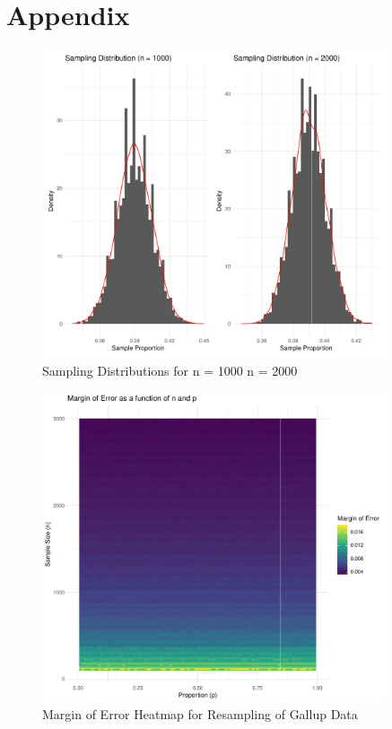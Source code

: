 \documentclass{article}\usepackage[]{graphicx}\usepackage[]{xcolor}
\begin{document}
\newpage
\onecolumn
\section{Appendix}

\begin{figure}[h]
\centering
\includegraphics[width=0.9\textwidth]{Sampling_distributions.pdf}
\caption{Sampling Distributions for n = 1000 n = 2000}
\end{figure}

\begin{figure}[h]
\centering
\includegraphics[width=0.9\textwidth]{MOEheatmap.pdf}
\caption{Margin of Error Heatmap for Resampling of Gallup Data}
\end{figure}
\end{document}
